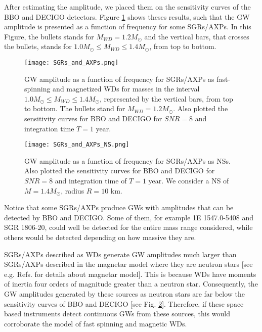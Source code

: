 \documentclass{ws-procs961x669}            %
\begin{document}
After estimating the amplitude, we placed them on the sensitivity curves of the BBO and DECIGO detectors. Figure \ref{fig:5} shows theses results, such that the GW amplitude is presented as a function of frequency for some SGRs/AXPs. In this Figure, the bullets stands for $M_{WD} = 1.2 M_{\odot }$ and the vertical bars, that crosses the bullets, stands for  $1.0 M_{\odot} \leq   M_{WD} \leq  1.4 M_{\odot} $, from top to bottom. 

\begin{figure}
\begin{center}
\texttt{[image: SGRs\_and\_AXPs.png]}
\caption{GW amplitude as a function of frequency for SGRs/AXPs as fast-spinning and magnetized WDs for masses in the interval  $1.0 M_{\odot} \leq  M_{WD} \leq  1.4 M_{\odot}$, represented by the vertical bars, from top to bottom. The bullets stand for $M_{WD} = 1.2 M_{\odot }$. Also plotted the sensitivity curves for BBO and DECIGO for $SNR = 8$ and integration time $T = 1$ year.}
\label{fig:5} 
\end{center}
\end{figure}


\begin{figure}
\begin{center}
\texttt{[image: SGRs\_and\_AXPs\_NS.png]}
\caption{GW amplitude as a function of frequency for SGRs/AXPs as NSs. Also plotted the sensitivity curves for BBO and DECIGO for $SNR = 8$ and integration time of $T = 1$ year. We consider a NS of $M = 1.4 M_{\odot}$, radius $R = 10$ km.}
\label{fig:6} 
\end{center}
\end{figure}


Notice that some SGRs/AXPs produce GWs with amplitudes that can be detected by BBO and DECIGO. Some of them, for example 1E 1547.0-5408 and SGR 1806-20, could well be detected for the entire mass range considered, while others would be detected depending on how massive they are.

SGRs/AXPs described as WDs generate GW amplitudes much larger than SGRs/AXPs described in the magnetar model where they are neutron stars [see e.g. Refs.  for details about magnetar model]. This is because WDs have moments of inertia four orders of magnitude greater than a neutron star. Consequently, the GW amplitudes generated by these sources as neutron stars are far below the sensitivity curves of BBO and DECIGO [see Fig. \ref{fig:6}]. Therefore, if these space based instruments detect continuous GWs from these sources, this would corroborate the model of fast spinning and magnetic WDs.
\end{document}
